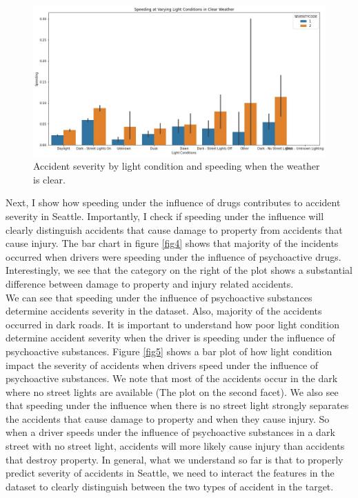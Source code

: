 \documentclass[a4paper,12pt]{article}
\begin{document}
\begin{figure}[H]
	\centering
	\includegraphics[width=1.0\textwidth]{li_sp_wet.jpg}
	\caption{Accident severity by light condition and speeding when the weather is clear.}
	\label{fig3}
\end{figure}

Next, I show how speeding under the influence of drugs contributes to accident severity in Seattle. Importantly, I check if speeding under the influence will clearly distinguish accidents that cause damage to property from accidents that cause injury. The bar chart in figure \ref{fig4} shows that majority of the incidents occurred when drivers were speeding under the influence of psychoactive drugs. Interestingly, we see that the category on the right of the plot shows a substantial difference between damage to property and injury related accidents.\\

We can see that speeding under the influence of psychoactive substances determine accidents severity in the dataset. Also, majority of the accidents occurred in dark roads. It is important to understand how poor light condition determine accident severity when the driver is speeding under the influence of psychoactive substances. Figure \ref{fig5} shows a bar plot of how light condition impact the severity of accidents when drivers speed under the influence of psychoactive substances. We note that most of the accidents occur in the dark where no street lights are available (The plot on the second facet). We also see that speeding under the influence when there is no street light strongly separates the accidents that cause damage to property and when they cause injury. So when a driver speeds under the influence of psychoactive substances in a dark street with no street light, accidents will more likely cause injury than accidents that destroy property. In general, what we understand so far is that to properly predict severity of accidents in Seattle, we need to interact the features in the dataset to clearly distinguish between the two types of accident in the target. \\
\end{document}
